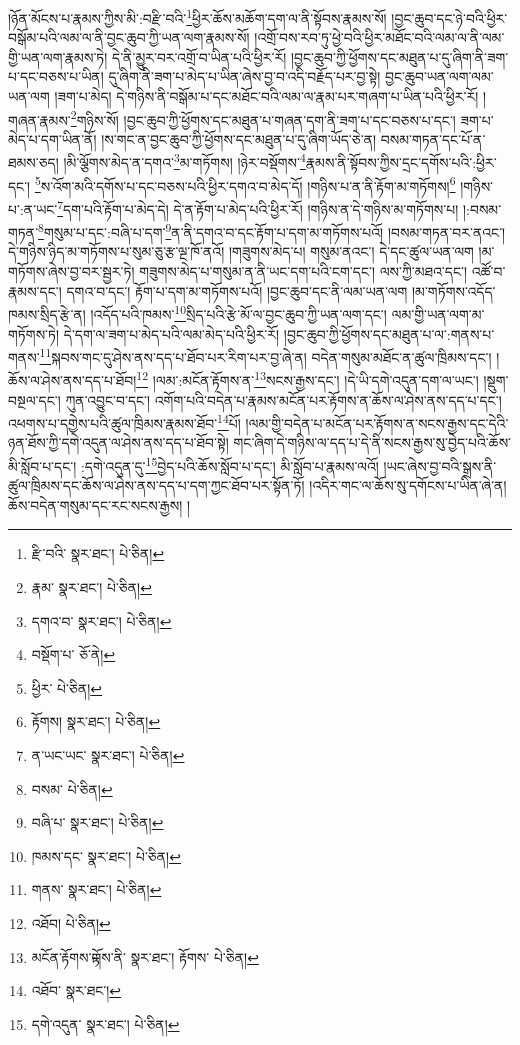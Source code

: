 །ཉོན་མོངས་པ་རྣམས་ཀྱིས་མི་:བརྫི་བའི་\footnote{རྫི་བའི་  སྣར་ཐང་།  པེ་ཅིན། }ཕྱིར་ཆོས་མཆོག་དག་ལ་ནི་སྟོབས་རྣམས་སོ། །བྱང་ཆུབ་དང་ཉེ་བའི་ཕྱིར་བསྒོམ་པའི་ལམ་ལ་ནི་བྱང་ཆུབ་ཀྱི་ཡན་ལག་རྣམས་སོ། །འགྲོ་བས་རབ་ཏུ་ཕྱེ་བའི་ཕྱིར་མཐོང་བའི་ལམ་ལ་ནི་ལམ་གྱི་ཡན་ལག་རྣམས་ཏེ། དེ་ནི་མྱུར་བར་འགྲོ་བ་ཡིན་པའི་ཕྱིར་རོ། །བྱང་ཆུབ་ཀྱི་ཕྱོགས་དང་མཐུན་པ་དུ་ཞིག་ནི་ཟག་པ་དང་བཅས་པ་ཡིན། དུ་ཞིག་ནི་ཟག་པ་མེད་པ་ཡིན་ཞེས་བྱ་བ་འདི་བརྗོད་པར་བྱ་སྟེ། བྱང་ཆུབ་ཡན་ལག་ལམ་ཡན་ལག །ཟག་པ་མེད། དེ་གཉིས་ནི་བསྒོམ་པ་དང་མཐོང་བའི་ལམ་ལ་རྣམ་པར་གཞག་པ་ཡིན་པའི་ཕྱིར་རོ། །གཞན་རྣམས་\footnote{རྣམ་  སྣར་ཐང་།  པེ་ཅིན། }གཉིས་སོ། །བྱང་ཆུབ་ཀྱི་ཕྱོགས་དང་མཐུན་པ་གཞན་དག་ནི་ཟག་པ་དང་བཅས་པ་དང་། ཟག་པ་མེད་པ་དག་ཡིན་ནོ། །ས་གང་ན་བྱང་ཆུབ་ཀྱི་ཕྱོགས་དང་མཐུན་པ་དུ་ཞིག་ཡོད་ཅེ་ན། བསམ་གཏན་དང་པོ་ན་ཐམས་ཅད། །མི་ལྕོགས་མེད་ན་དགའ་\footnote{དགའ་བ་  སྣར་ཐང་།  པེ་ཅིན། }མ་གཏོགས། །ཉེར་བསྡོགས་\footnote{བསྡོག་པ་  ཅོ་ནེ། }རྣམས་ནི་སྟོབས་ཀྱིས་དྲང་དགོས་པའི་:ཕྱིར་དང་། \footnote{ཕྱིར་  པེ་ཅིན། }ས་འོག་མའི་དགོས་པ་དང་བཅས་པའི་ཕྱིར་དགའ་བ་མེད་དོ། །གཉིས་པ་ན་ནི་རྟོག་མ་གཏོགས།\footnote{རྟོགས།  སྣར་ཐང་།  པེ་ཅིན། } །གཉིས་པ་:ན་ཡང་\footnote{ན་ཡང་ཡང་  སྣར་ཐང་།  པེ་ཅིན། }དག་པའི་རྟོག་པ་མེད་དེ། དེ་ན་རྟོག་པ་མེད་པའི་ཕྱིར་རོ། །གཉིས་ན་དེ་གཉིས་མ་གཏོགས་པ། །:བསམ་གཏན་\footnote{བསམ་  པེ་ཅིན། }གསུམ་པ་དང་:བཞི་པ་དག་\footnote{བཞི་པ་  སྣར་ཐང་།  པེ་ཅིན། }ན་ནི་དགའ་བ་དང་རྟོག་པ་དག་མ་གཏོགས་པའོ། །བསམ་གཏན་བར་ནའང་། དེ་གཉིས་ཉིད་མ་གཏོགས་པ་སུམ་ཅུ་རྩ་ལྔ་ཁོ་ནའོ། །གཟུགས་མེད་པ། གསུམ་ནའང་། དེ་དང་ཚུལ་ཡན་ལག །མ་གཏོགས་ཞེས་བྱ་བར་སྦྱར་ཏེ། གཟུགས་མེད་པ་གསུམ་ན་ནི་ཡང་དག་པའི་ངག་དང་། ལས་ཀྱི་མཐའ་དང་། འཚོ་བ་རྣམས་དང་། དགའ་བ་དང་། རྟོག་པ་དག་མ་གཏོགས་པའོ། །བྱང་ཆུབ་དང་ནི་ལམ་ཡན་ལག །མ་གཏོགས་འདོད་ཁམས་སྲིད་རྩེ་ན། །འདོད་པའི་ཁམས་\footnote{ཁམས་དང་  སྣར་ཐང་།  པེ་ཅིན། }སྲིད་པའི་རྩེ་མོ་ལ་བྱང་ཆུབ་ཀྱི་ཡན་ལག་དང་། ལམ་གྱི་ཡན་ལག་མ་གཏོགས་ཏེ། དེ་དག་ལ་ཟག་པ་མེད་པའི་ལམ་མེད་པའི་ཕྱིར་རོ། །བྱང་ཆུབ་ཀྱི་ཕྱོགས་དང་མཐུན་པ་ལ་:གནས་པ་གནས་\footnote{གནས་  སྣར་ཐང་།  པེ་ཅིན། }སྐབས་གང་དུ་ཤེས་ནས་དད་པ་ཐོབ་པར་རིག་པར་བྱ་ཞེ་ན། བདེན་གསུམ་མཐོང་ན་ཚུལ་ཁྲིམས་དང་། །ཆོས་ལ་ཤེས་ནས་དད་པ་ཐོབ།\footnote{འཐོབ།  པེ་ཅིན། } །ལམ་:མངོན་རྟོགས་ན་\footnote{མངོན་རྟོགས་ྟོགས་ནི་  སྣར་ཐང་། རྟོགས་  པེ་ཅིན། }སངས་རྒྱས་དང་། །དེ་ཡི་དགེ་འདུན་དག་ལ་ཡང་། །སྡུག་བསྔལ་དང་། ཀུན་འབྱུང་བ་དང་། འགོག་པའི་བདེན་པ་རྣམས་མངོན་པར་རྟོགས་ན་ཆོས་ལ་ཤེས་ནས་དད་པ་དང་། འཕགས་པ་དགྱེས་པའི་ཚུལ་ཁྲིམས་རྣམས་ཐོབ་\footnote{འཐོབ་  སྣར་ཐང་། }པོ། །ལམ་གྱི་བདེན་པ་མངོན་པར་རྟོགས་ན་སངས་རྒྱས་དང་དེའི་ཉན་ཐོས་ཀྱི་དགེ་འདུན་ལ་ཤེས་ནས་དད་པ་ཐོབ་སྟེ། གང་ཞིག་དེ་གཉིས་ལ་དད་པ་དེ་ནི་སངས་རྒྱས་སུ་བྱེད་པའི་ཆོས་མི་སློབ་པ་དང་། :དགེ་འདུན་དུ་\footnote{དགེ་འདུན་  སྣར་ཐང་།  པེ་ཅིན། }བྱེད་པའི་ཆོས་སློབ་པ་དང་། མི་སློབ་པ་རྣམས་ལའོ། །ཡང་ཞེས་བྱ་བའི་སྒྲས་ནི་ཚུལ་ཁྲིམས་དང་ཆོས་ལ་ཤེས་ནས་དད་པ་དག་ཀྱང་ཐོབ་པར་སྟོན་ཏོ། །འདིར་གང་ལ་ཆོས་སུ་དགོངས་པ་ཡིན་ཞེ་ན། ཆོས་བདེན་གསུམ་དང་རང་སངས་རྒྱས། །
